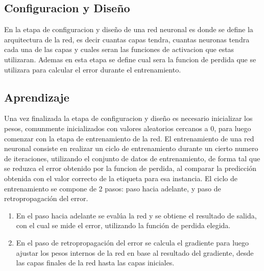 \documentclass[a4paper,11pt,spanish]{book}
\begin{document}
      \subsection{Configuracion y Diseño}
	En la etapa de configuracion y diseño de una red neuronal es donde se define la arquitectura de la red, es decir cuantas capas tendra, cuantas neuronas tendra cada una de las capas
	y cuales seran las funciones de activacion que estas utilizaran.
	Ademas en esta etapa se define cual sera la funcion de perdida que se utilizara para calcular el error durante el entrenamiento.

      \subsection {Aprendizaje}
	Una vez finalizada la etapa de configuracion y diseño es necesario inicializar los pesos, comunmente inicializados con valores aleatorios cercanos a 0, para luego comenzar con la etapa
	de entrenamiento de la red.
	El entrenamiento de una red neuronal consiste en realizar un ciclo de entrenamiento durante un cierto numero de iteraciones, utilizando el conjunto de datos de entrenamiento,
	de forma tal que se reduzca el error obtenido por la funcion de perdida, al comparar la predicción obtenida con el valor correcto de la etiqueta para esa instancia.
	El ciclo de entrenamiento se compone de 2 pasos: paso hacia adelante, y paso de retropropagación del error.
	\begin{enumerate}
	  \item En el paso hacia adelante se evalúa la red y se obtiene el resultado de salida, con el cual se mide el error, utilizando la función de perdida elegida.
	  \item En el paso de retropropagación del error se calcula el gradiente para luego ajustar los pesos internos de la red en base al resultado del gradiente,
	    desde las capas finales de la red hasta las capas iniciales.
	\end{enumerate}
\end{document}
